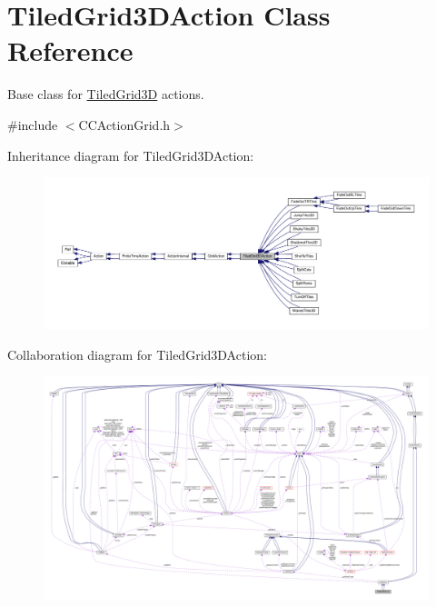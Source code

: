 \hypertarget{classTiledGrid3DAction}{}\section{Tiled\+Grid3\+D\+Action Class Reference}
\label{classTiledGrid3DAction}


Base class for \hyperlink{classTiledGrid3D}{Tiled\+Grid3D} actions.  




{\ttfamily \#include $<$C\+C\+Action\+Grid.\+h$>$}



Inheritance diagram for Tiled\+Grid3\+D\+Action\+:
\nopagebreak
\begin{figure}[H]
\begin{center}
\leavevmode
\includegraphics[width=350pt]{classTiledGrid3DAction__inherit__graph}
\end{center}
\end{figure}


Collaboration diagram for Tiled\+Grid3\+D\+Action\+:
\nopagebreak
\begin{figure}[H]
\begin{center}
\leavevmode
\includegraphics[width=350pt]{classTiledGrid3DAction__coll__graph}
\end{center}
\end{figure}
